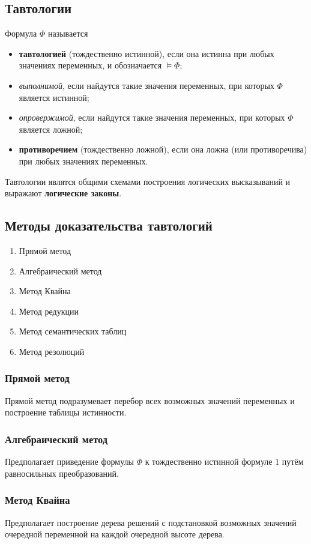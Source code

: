 \subsection{Тавтологии}
\dftion Формула $\Phi$ называется
\begin{itemize}
    \item \textbf{тавтологией} (тождественно истинной), если она истинна при любых значениях переменных, и обозначается $\vDash \Phi$;
    \item \textit{выполнимой}, если найдутся такие значения переменных, при которых $\Phi$ является истинной;
    \item \textit{опровержимой}, если найдутся такие значения переменных, при которых $\Phi$ является ложной;
    \item \textbf{противоречием} (тождественно ложной), если она ложна (или противоречива) при любых значениях переменных.
\end{itemize}
\dftion Тавтологии являтся общими схемами построения логических высказываний и выражают \textbf{логические законы}.
\subsection{Методы доказательства тавтологий}
\begin{enumerate}
    \item Прямой метод
    \item Алгебраический метод
    \item Метод Квайна
    \item Метод редукции
    \item Метод семантических таблиц
    \item Метод резолюций
\end{enumerate}

\subsubsection{Прямой метод}
Прямой метод подразумевает перебор всех возможных значений переменных и построение таблицы истинности.

\subsubsection{Алгебраический метод}
Предполагает приведение формулы $\Phi$ к тождественно истинной формуле $1$ путём равносильных преобразований.

\subsubsection{Метод Квайна}
Предполагает построение дерева решений с подстановкой возможных значений очередной переменной на каждой очередной высоте дерева.

